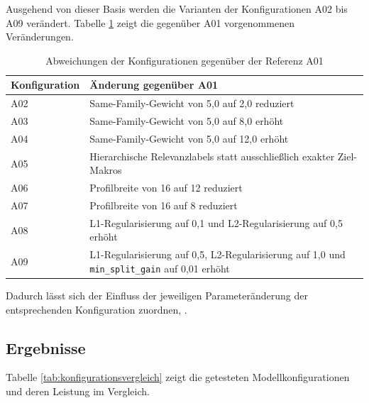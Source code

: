 Ausgehend von dieser Basis werden die Varianten der Konfigurationen A02 bis A09 verändert.
Tabelle \ref{tab:konfigurationsabweichungen} zeigt die gegenüber A01 vorgenommenen Veränderungen. 

\begin{table}[H] 
    \centering 
    \caption{Abweichungen der Konfigurationen gegenüber der Referenz A01} 
    \label{tab:konfigurationsabweichungen} 
    \begin{tabular}{lp{8cm}} 
        \toprule 
        \textbf{Konfiguration} & \textbf{Änderung gegenüber A01} \\ 
        \midrule 
        A02 & Same-Family-Gewicht von 5,0 auf 2,0 reduziert \\ 
        A03 & Same-Family-Gewicht von 5,0 auf 8,0 erhöht \\ 
        A04 & Same-Family-Gewicht von 5,0 auf 12,0 erhöht \\ 
        A05 & Hierarchische Relevanzlabels statt ausschließlich exakter Ziel-Makros \\ 
        A06 & Profilbreite von 16 auf 12 reduziert \\ 
        A07 & Profilbreite von 16 auf 8 reduziert \\ 
        A08 & L1-Regularisierung auf 0,1 und L2-Regularisierung auf 0,5 erhöht \\ 
        A09 & L1-Regularisierung auf 0,5, L2-Regularisierung auf 1,0 und \texttt{min\_split\_gain} auf 0,01 erhöht \\ 
        \bottomrule 
    \end{tabular} 
\end{table}

Dadurch lässt sich der Einfluss der jeweiligen Parameteränderung der entsprechenden Konfiguration zuordnen, \parencite{LTR_Configuration_Test_Series}.

\subsection{Ergebnisse}

Tabelle \ref{tab:konfigurationsvergleich} zeigt die getesteten Modellkonfigurationen und deren Leistung im Vergleich.

